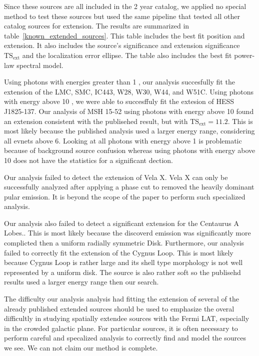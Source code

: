 \documentclass[12pt,preprint]{aastex}
\newcommand{\gev}{\text{GeV}\xspace}
\newcommand{\tsext}{{\ensuremath{\text{TS}_\text{ext}}}\xspace}
\newcommand{\ts}{\text{TS}\xspace}
\begin{document}
Since these sources are all included in the 2 year catalog, we applied
no special method to test these sources but used the same pipeline
that tested all other catalog sources for extension.  The results are
summarized in table~\ref{known_extended_sources}.  This table includes
the best fit position and extension. It also includes the source's
significance \ts and extension significance \tsext and the localization
error ellipse. The table also includes the best fit power-law spectral
model.

Using photons with energies greater than 1 \gev, our analysis succesfully
fit the extension of the LMC, SMC, IC443, W28, W30, W44, and W51C.
Using photons with energy above 10 \gev, we were able to succesffuly
fit the extesion of HESS J1825-137.
Our analysis of MSH 15-52 using photons with energy above 10 \gev found an extension
consistent with the publisehed result, but with $\tsext=11.2$. This is
most likely because the published analysis used a larger energy range,
considering all evnets above 6\gev. Looking at all photons with
energy above 1 \gev 
is problematic because of background source confusion whereas using photons
with energy above 10 \gev does not have the statistics for a significant dection.

Our analysis failed to detect the extension of Vela X. Vela X can only be
successfully analyzed after applying a phase cut to removed the heavily
dominant pular emission. It is beyond the scope of the paper to perform
such specialized analysis.

Our analysis also failed to detect a significant extension for the
Centaurus A Lobes.\cite{CenA paper}. This is most likely because the
discoverd emission was significantly more complicted then a uniform
radially symmetric Disk.  Furthermore, our analysis failed to correctly
fit the extension of the Cygnus Loop\cite{Cygnus Loop Paper}.  This is
most likely because Cygnus Loop is rather large and its shell type
morphology is not well represented by a uniform disk. The source is
also rather soft so the publisehd results used a larger energy range
then our search.

The difficulty our analysis analysis had fitting the extension of several
of the already published extended sources should be used to emphasize the
overal difficultly in studying spatially extendee sources with the Fermi
LAT, especially in the crowded galactic plane. For particular sources,
it is often necessary to perform careful and specalized analysis to
correctly find and model the sources we see. We can not claim our method
is complete.
\end{document}
